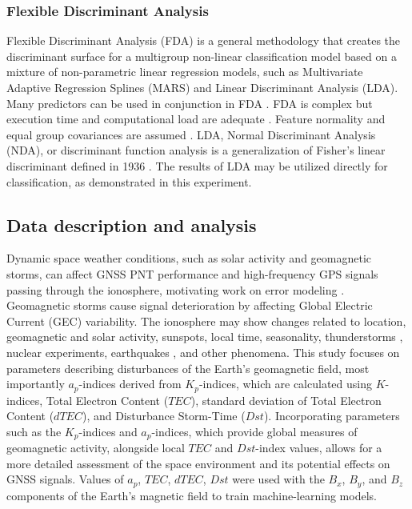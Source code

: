 \let\LaTeXcline\cline\documentclass[sn-mathphys-num]{sn-jnl}\let\cline\LaTeXcline
\begin{document}
\subsubsection{Flexible Discriminant Analysis}

Flexible Discriminant Analysis (FDA) is a general methodology that creates the discriminant surface for a multigroup non-linear classification model \cite{mclachlan2005discriminant} based on a mixture of non-parametric linear regression models, such as Multivariate Adaptive Regression Splines (MARS) and Linear Discriminant Analysis (LDA). Many predictors can be used in conjunction in FDA \cite{HastieTibshirani2009}. FDA is complex but execution time and computational load are adequate \cite{reynes2006choice}. Feature normality and equal group covariances are assumed \cite{wetcher2011analyzing}. LDA, Normal Discriminant Analysis (NDA), or discriminant function analysis \cite{cohen2013applied} is a generalization of Fisher's linear discriminant defined in 1936 \cite{mclachlan2005discriminant}. The results of LDA may be utilized directly for classification, as demonstrated in this experiment.

\subsection{Data description and analysis}

Dynamic space weather conditions, such as solar activity and geomagnetic storms, can affect  GNSS PNT performance and high-frequency GPS signals passing through the ionosphere, motivating work on error modeling \cite{zolesi2014ionospheric}. Geomagnetic storms cause signal deterioration by affecting Global Electric Current (GEC) variability. The ionosphere may show changes related to location, geomagnetic and solar activity, sunspots, local time, seasonality, thunderstorms \cite{vellinov1992ionospheric}, nuclear experiments, earthquakes \cite{liu20142013}, and other phenomena. This study focuses on parameters describing disturbances of the Earth's geomagnetic field, most importantly $a_{p}$-indices derived from $K_{p}$-indices, which are calculated using $K$-indices, Total Electron Content ($TEC$), standard deviation of Total Electron Content ($dTEC$), and Disturbance Storm-Time ($Dst$). Incorporating parameters such as the $K_{p}$-indices and $a_{p}$-indices, which provide global measures of geomagnetic activity, alongside local $TEC$ and $Dst$-index values, allows for a more detailed assessment of the space environment and its potential effects on GNSS signals. Values of $a_{p}$, $TEC$, $dTEC$, $Dst$ were used with the $B_x$, $B_y$, and $B_z$ components of the Earth's magnetic field to train machine-learning models.
\end{document}
